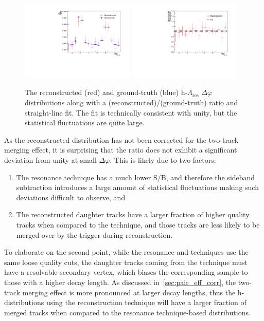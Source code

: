 \begin{figure}[ht]
    \centering
    \includegraphics[width=0.48\textwidth]{figures/analysis/h_lambda_mc_closure_res.pdf}
    \includegraphics[width=0.48\textwidth]{figures/analysis/h_lambda_mc_closure_ratio_res.pdf}
    \caption{The reconstructed (red) and ground-truth (blue) h-$\Lambda_{\text{res}}$ $\Delta\varphi$ distributions along with a (reconstructed)/(ground-truth) ratio and straight-line fit. The fit is technically consistent with unity, but the statistical fluctuations are quite large.}
    \label{fig:res_mc_closure}
\end{figure}

As the reconstructed distribution has not been corrected for the two-track merging effect, it is surprising that the ratio does not exhibit a significant deviation from unity at small $\Delta\varphi$. This is likely due to two factors:
%
\begin{enumerate}
\item The resonance technique has a much lower S/B, and therefore the sideband subtraction introduces a large amount of statistical fluctuations making such deviations difficult to observe, and
\item The reconstructed daughter tracks have a larger fraction of higher quality tracks when compared to the  \vz technique, and those tracks are less likely to be merged over by the trigger during reconstruction.
\end{enumerate}
%
To elaborate on the second point, while the resonance and \vz techniques use the same loose quality cuts, the daughter tracks coming from the \vz technique must have a resolvable secondary vertex, which biases the corresponding \lmb sample to those with a higher decay length. As discussed in~\ref{sec:pair_eff_corr}, the two-track merging effect is more pronounced at larger decay lengths, thus the h-\lmb distributions using the \vz reconstruction technique will have a larger fraction of merged tracks when compared to the resonance technique-based distributions.

